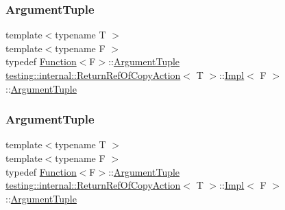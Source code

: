 \subsubsection{\texorpdfstring{ArgumentTuple}{ArgumentTuple}\hspace{0.1cm}{\footnotesize\ttfamily [1/3]}}
{\footnotesize\ttfamily template$<$typename T $>$ \\
template$<$typename F $>$ \\
typedef \mbox{\hyperlink{structtesting_1_1internal_1_1_function}{Function}}$<$F$>$\+::\mbox{\hyperlink{classtesting_1_1_action_interface_af72720d864da4d606629e83edc003511}{Argument\+Tuple}} \mbox{\hyperlink{classtesting_1_1internal_1_1_return_ref_of_copy_action}{testing\+::internal\+::\+Return\+Ref\+Of\+Copy\+Action}}$<$ T $>$\+::\mbox{\hyperlink{classtesting_1_1internal_1_1_return_ref_of_copy_action_1_1_impl}{Impl}}$<$ F $>$\+::\mbox{\hyperlink{classtesting_1_1_action_interface_af72720d864da4d606629e83edc003511}{Argument\+Tuple}}}

\mbox{\label{classtesting_1_1internal_1_1_return_ref_of_copy_action_1_1_impl_aae70fc272cfaa8efebffffdeaca36cea}} 
\subsubsection{\texorpdfstring{ArgumentTuple}{ArgumentTuple}\hspace{0.1cm}{\footnotesize\ttfamily [2/3]}}
{\footnotesize\ttfamily template$<$typename T $>$ \\
template$<$typename F $>$ \\
typedef \mbox{\hyperlink{structtesting_1_1internal_1_1_function}{Function}}$<$F$>$\+::\mbox{\hyperlink{classtesting_1_1_action_interface_af72720d864da4d606629e83edc003511}{Argument\+Tuple}} \mbox{\hyperlink{classtesting_1_1internal_1_1_return_ref_of_copy_action}{testing\+::internal\+::\+Return\+Ref\+Of\+Copy\+Action}}$<$ T $>$\+::\mbox{\hyperlink{classtesting_1_1internal_1_1_return_ref_of_copy_action_1_1_impl}{Impl}}$<$ F $>$\+::\mbox{\hyperlink{classtesting_1_1_action_interface_af72720d864da4d606629e83edc003511}{Argument\+Tuple}}}


